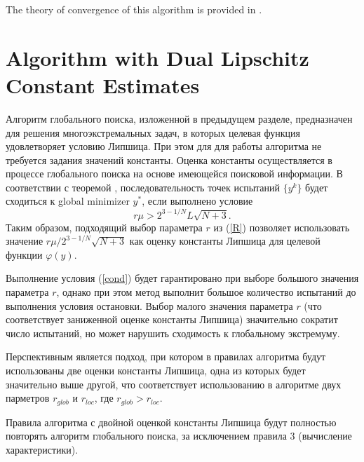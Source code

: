 \documentclass[runningheads]{llncs}
\begin{document}
The theory of convergence of this algorithm is provided in \cite{Strongin2000}.

\section{Algorithm with Dual Lipschitz Constant Estimates}

Алгоритм глобального поиска, изложенной в предыдущем разделе, предназначен для решения многоэкстремальных задач, в которых целевая функция удовлетворяет условию Липшица. При этом для для работы алгоритма не требуется задания  значений константы. Оценка константы осуществляется в процессе глобального поиска на основе имеющейся поисковой информации. 
В соответствии с теоремой \cite{Strongin2000}, последовательность точек испытаний $\{y^k\}$ будет сходиться к global minimizer $y^*$, если выполнено условие  
\begin{equation}\label{cond}
r\mu > 2^{3-1/N}L\sqrt{N+3}.
\end{equation}
Таким образом, подходящий выбор параметра $r$ из (\ref{R}) позволяет использовать значение $r\mu / 2^{3-1/N}\sqrt{N+3}$ как оценку константы Липшица для целевой функции $\varphi(y)$.

Выполнение условия (\ref{cond}) будет гарантировано при выборе большого значения параметра $r$, однако при этом метод выполнит большое количество испытаний до выполнения условия остановки.
Выбор малого значения параметра $r$ (что соответствует заниженной оценке константы Липшица) значительно сократит число испытаний, но может нарушить сходимость к глобальному экстремуму.

Перспективным является подход, при котором в правилах алгоритма будут использованы две оценки константы Липшица, одна из которых будет значительно выше другой, что соответствует использованию в алгоритме двух парметров $r_{glob}$ и $r_{loc}$, где $r_{glob} > r_{loc}$.

Правила алгоритма с двойной оценкой константы Липшица будут полностью повторять алгоритм глобального поиска, за исключением правила 3 (вычисление характеристики).
\end{document}
